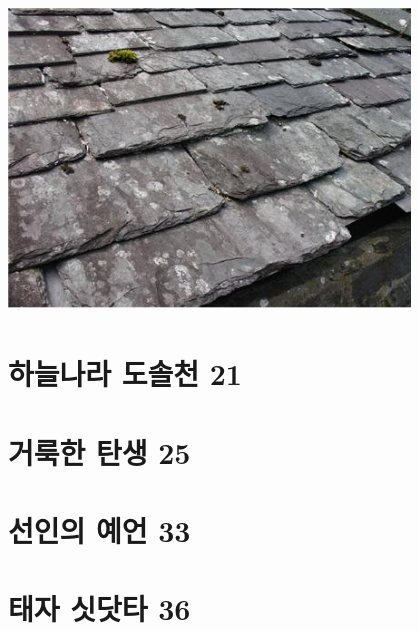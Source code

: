 \documentclass[12pt, a4paper, oneside]{book}
\let\stdsection\section
\renewcommand\section{\newpage\stdsection}
\begin{document}
			\begin{center}
			\includegraphics[width=0.8\textwidth]{./fig/slate_0001.jpg}
			\end{center}


%
	\section{하늘나라 도솔천 21 }

%
	\section{거룩한 탄생 25 }

%
	\section{선인의 예언 33 }

%
	\section{태자 싯닷타 36 }

%
\end{document}
